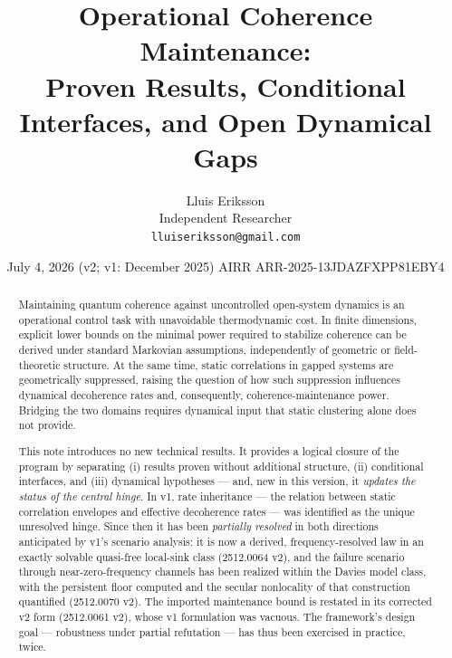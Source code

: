 \documentclass[11pt,a4paper]{article}
\title{Operational Coherence Maintenance:\\
Proven Results, Conditional Interfaces, and Open Dynamical Gaps}
\author{Lluis Eriksson\\ \small Independent Researcher\\
\small \texttt{lluiseriksson@gmail.com}}
\date{July 4, 2026 \quad (v2; v1: December 2025) \quad AIRR ARR-2025-13JDAZFXPP81EBY4}
\theoremstyle{plain}
\theoremstyle{definition}
\theoremstyle{remark}
\begin{document}
\maketitle

\begin{center}
\end{center}

\begin{abstract}
Maintaining quantum coherence against uncontrolled open-system dynamics is an
operational control task with unavoidable thermodynamic cost. In finite
dimensions, explicit lower bounds on the minimal power required to stabilize
coherence can be derived under standard Markovian assumptions, independently
of geometric or field-theoretic structure. At the same time, static
correlations in gapped systems are geometrically suppressed, raising the
question of how such suppression influences dynamical decoherence rates and,
consequently, coherence-maintenance power. Bridging the two domains requires
dynamical input that static clustering alone does not provide.

This note introduces no new technical results. It provides a logical closure
of the program by separating (i) results proven without additional structure,
(ii) conditional interfaces, and (iii) dynamical hypotheses --- and, new in
this version, it \emph{updates the status of the central hinge}. In v1, rate
inheritance --- the relation between static correlation envelopes and
effective decoherence rates --- was identified as the unique unresolved
hinge. Since then it has been \emph{partially resolved} in both directions
anticipated by v1's scenario analysis: it is now a derived, frequency-resolved
law in an exactly solvable quasi-free local-sink class (2512.0064 v2), and the
failure scenario through near-zero-frequency channels has been realized within
the Davies model class, with the persistent floor computed and the secular
nonlocality of that construction quantified (2512.0070 v2). The imported
maintenance bound is restated in its corrected v2 form (2512.0061 v2), whose
v1 formulation was vacuous. The framework's design goal --- robustness under
partial refutation --- has thus been exercised in practice, twice.
\end{abstract}
\end{document}
